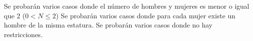 \documentclass{oci}
\begin{document}
\begin{scoreDescription}
   Se probarán varios casos donde el número de hombres y mujeres es menor o igual que 2 ($0 < N \leq 2$)
   Se probarán varios casos donde para cada mujer existe un hombre de la misma estatura.
   Se probarán varios casos donde no hay restricciones.
\end{scoreDescription}

\begin{sampleDescription}
\end{sampleDescription}
\end{document}
